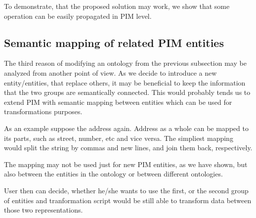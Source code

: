 To demonstrate, that the proposed solution may work, we show that some operation can be easily propagated in PIM level.



\newpage
\subsection{Semantic mapping of related PIM entities}

The third reason of modifying an ontology from the previous subsection may be analyzed from another point of view. As we decide to introduce a new entity/entities, that replace others, it may be beneficial to keep the information that the two groups are semantically connected. This would probably tends us to extend PIM with semantic mapping between entities which can be used for transformations purposes.

As an example suppose the address again. Address as a whole can be mapped to its parts, such as street, number, etc and vice versa. The simpliest mapping would split the string by commas and new lines, and join them back, respectively.

The mapping may not be used just for new PIM entities, as we have shown, but also between the entities in the ontology or between different ontologies.

User then can decide, whether he/she wants to use the first, or the second group of entities and tranformation script would be still able to transform data between those two representations.

